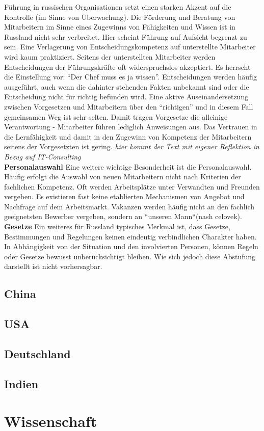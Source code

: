 	Führung in russischen Organisationen setzt einen starken Akzent auf die Kontrolle (im 
	Sinne von Überwachung). Die Förderung und Beratung von Mitarbeitern im Sinne eines 
	Zugewinns von Fähigkeiten und Wissen ist in Russland nicht sehr verbreitet. Hier scheint 
	Führung auf Aufsicht begrenzt zu sein. Eine Verlagerung von Entscheidungskompetenz 
	auf unterstellte Mitarbeiter wird kaum praktiziert. 
	Seitens der unterstellten Mitarbeiter werden Entscheidungen der Führungskräfte oft 
	widerspruchslos akzeptiert. Es herrscht die Einstellung vor: “Der Chef muss es ja wissen”. Entscheidungen werden häufig ausgeführt, auch wenn die dahinter stehenden Fakten 
	unbekannt sind oder die Entscheidung nicht für richtig befunden wird. Eine aktive 
	Auseinandersetzung zwischen Vorgesetzen und Mitarbeitern über den “richtigen” und in 
	diesem Fall gemeinsamen Weg ist sehr selten. Damit tragen Vorgesetze die alleinige 
	Verantwortung - Mitarbeiter führen lediglich Anweisungen aus. Das Vertrauen in die 
	Lernfähigkeit und damit in den Zugewinn von Kompetenz der Mitarbeitern seitens der 
	Vorgesetzten ist gering. 
	\textit{hier kommt der Text mit eigener Reflektion in Bezug auf IT-Consulting}\\
	
	
	\textbf{Personalauswahl}
	 Eine weitere wichtige Besonderheit ist die Personalauswahl. Häufig erfolgt die Auswahl von neuen 
	 Mitarbeitern nicht nach Kriterien der fachlichen Kompetenz. Oft werden Arbeitsplätze unter Verwandten und 
	 Freunden vergeben. Es existieren fast keine etablierten Mechanismen von Angebot und Nachfrage auf dem 
	 Arbeitsmarkt. Vakanzen werden häufig nicht an den fachlich geeignetsten Bewerber vergeben, sondern an 
	 ``unseren Mann``(nash celovek).\\
	 \textbf{Gesetze}
	 Ein weiteres für Russland typisches Merkmal ist, dass Gesetze, Bestimmungen und 
	 Regelungen keinen eindeutig verbindlichen Charakter haben. In Abhängigkeit von der 
	 Situation und den involvierten Personen, können Regeln oder Gesetze bewusst 
	 unberücksichtigt bleiben. Wie sich jedoch diese Abstufung darstellt ist nicht vorhersagbar. 
	 

	\subsection{China}
	
	
	\subsection{USA}
	
	
	\subsection{Deutschland}
	
	
	\subsection{Indien}


\section{Wissenschaft}